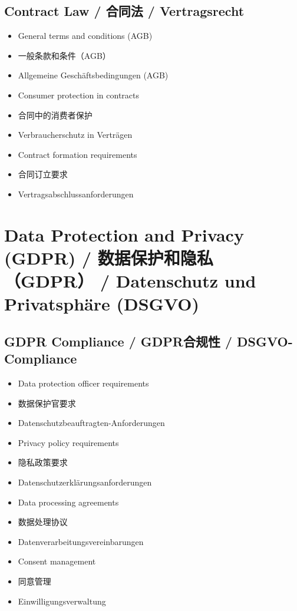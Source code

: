 \subsection{Contract Law / 合同法 / Vertragsrecht}
\begin{itemize}
    \item General terms and conditions (AGB)
    \item 一般条款和条件（AGB）
    \item Allgemeine Geschäftsbedingungen (AGB)
    \item Consumer protection in contracts
    \item 合同中的消费者保护
    \item Verbraucherschutz in Verträgen
    \item Contract formation requirements
    \item 合同订立要求
    \item Vertragsabschlussanforderungen
\end{itemize}

\section{Data Protection and Privacy (GDPR) / 数据保护和隐私（GDPR） / Datenschutz und Privatsphäre (DSGVO)}

\subsection{GDPR Compliance / GDPR合规性 / DSGVO-Compliance}
\begin{itemize}
    \item Data protection officer requirements
    \item 数据保护官要求
    \item Datenschutzbeauftragten-Anforderungen
    \item Privacy policy requirements
    \item 隐私政策要求
    \item Datenschutzerklärungsanforderungen
    \item Data processing agreements
    \item 数据处理协议
    \item Datenverarbeitungsvereinbarungen
    \item Consent management
    \item 同意管理
    \item Einwilligungsverwaltung
\end{itemize}

